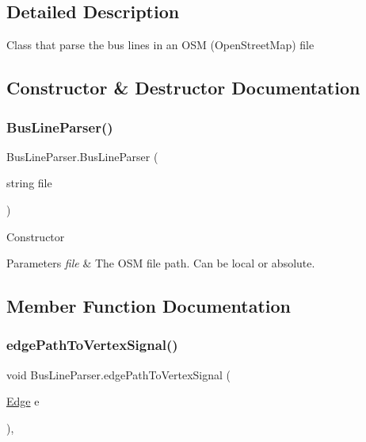 \subsection{Detailed Description}
Class that parse the bus lines in an O\+SM (Open\+Street\+Map) file 



\subsection{Constructor \& Destructor Documentation}
\mbox{\label{classBusLineParser_afbe7ee8e82c3e3d52f25e4eef11e1f7d}} 
\subsubsection{\texorpdfstring{Bus\+Line\+Parser()}{BusLineParser()}}
{\footnotesize\ttfamily Bus\+Line\+Parser.\+Bus\+Line\+Parser (\begin{DoxyParamCaption}\item[{string}]{file }\end{DoxyParamCaption})\hspace{0.3cm}{\ttfamily [inline]}}



Constructor 


\begin{DoxyParams}{Parameters}
{\em file} & The O\+SM file path. Can be local or absolute.\\
\hline
\end{DoxyParams}


\subsection{Member Function Documentation}
\mbox{\label{classBusLineParser_a996f46bf4ce1bf445e4466d1ad8bda11}} 
\subsubsection{\texorpdfstring{edge\+Path\+To\+Vertex\+Signal()}{edgePathToVertexSignal()}}
{\footnotesize\ttfamily void Bus\+Line\+Parser.\+edge\+Path\+To\+Vertex\+Signal (\begin{DoxyParamCaption}\item[{\hyperlink{classEdge}{Edge}}]{e }\end{DoxyParamCaption})\hspace{0.3cm}{\ttfamily [inline]}, {\ttfamily [private]}}




